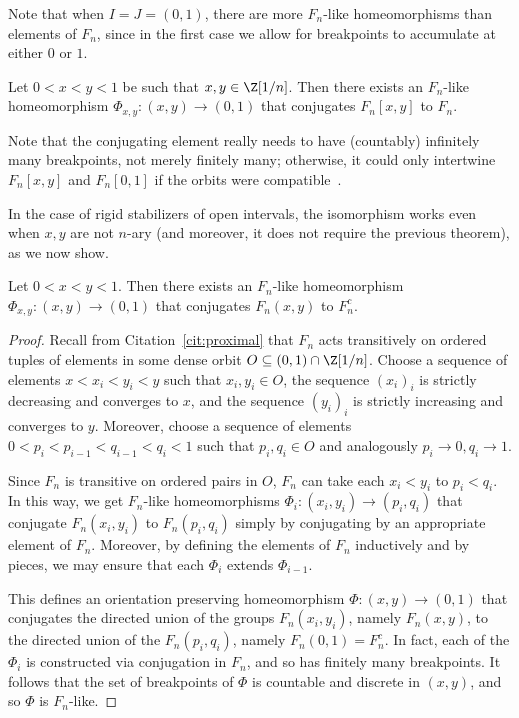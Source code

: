 Note that when $I = J = (0, 1)$, there are more $F_n$-like homeomorphisms than elements of $F_n$, since in the first case we allow for breakpoints to accumulate at either $0$ or $1$.

\begin{cit}
\label{cit:bieristrebel}

Let $0 < x < y < 1$ be such that $x, y \in \Z[1/n]$. Then there exists an $F_n$-like homeomorphism $\Phi_{x, y} \colon (x, y) \to (0, 1)$ that conjugates $F_n[x, y]$ to $F_n$.
\end{cit}

Note that the conjugating element really needs to have (countably) infinitely many breakpoints, not merely finitely many; otherwise, it could only intertwine $F_n[x, y]$ and $F_n[0, 1]$ if the orbits were compatible~\cite{hydelodha}.

In the case of rigid stabilizers of open intervals, the isomorphism works even when $x, y$ are not $n$-ary (and moreover, it does not require the previous theorem), as we now show.

\begin{prop}
\label{prop:rstab:open}

Let $0 < x < y < 1$. Then there exists an $F_n$-like homeomorphism $\Phi_{x, y} \colon (x, y) \to (0, 1)$ that conjugates $F_n(x, y)$ to $F_n^c$.
\end{prop}

\begin{proof}
Recall from Citation~\ref{cit:proximal} that $F_n$ acts transitively on ordered tuples of elements in some dense orbit $O\subseteq (0,1)\cap \Z[1/n]$. Choose a sequence of elements $x < x_i < y_i < y$ such that $x_i, y_i \in O$, the sequence $(x_i)_i$ is strictly decreasing and converges to $x$, and the sequence $(y_i)_i$ is strictly increasing and converges to $y$. Moreover, choose a sequence of elements $0 < p_i < p_{i-1} < q_{i-1} < q_i < 1$ such that $p_i, q_i \in O$ and analogously $p_i \to 0, q_i \to 1$.

Since $F_n$ is transitive on ordered pairs in $O$, $F_n$ can take each $x_i<y_i$ to $p_i<q_i$. In this way, we get $F_n$-like homeomorphisms $\Phi_i \colon (x_i, y_i) \to (p_i, q_i)$ that conjugate $F_n(x_i, y_i)$ to $F_n(p_i, q_i)$ simply by conjugating by an appropriate element of $F_n$. Moreover, by defining the elements of $F_n$ inductively and by pieces, we may ensure that each $\Phi_i$ extends $\Phi_{i-1}$.

This defines an orientation preserving homeomorphism $\Phi \colon (x, y) \to (0, 1)$ that conjugates the directed union of the groups $F_n(x_i, y_i)$, namely $F_n(x, y)$, to the directed union of the $F_n(p_i, q_i)$, namely $F_n(0, 1) = F_n^c$. In fact, each of the $\Phi_i$ is constructed via conjugation in $F_n$, and so has finitely many breakpoints. It follows that the set of breakpoints of $\Phi$ is countable and discrete in $(x, y)$, and so $\Phi$ is $F_n$-like.
\end{proof}

